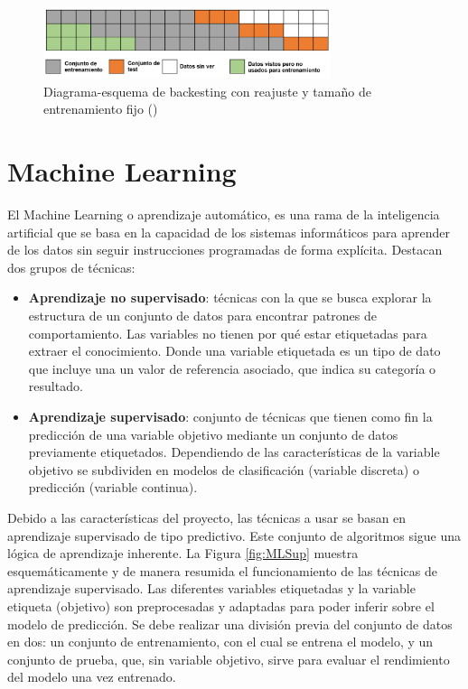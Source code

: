 \documentclass[12pt,a4paper]{report}
\begin{document}
\begin{itemize}
    \begin{figure}[H]
    \centering
    \includegraphics[width=0.75\textwidth]{Images/tfm-2.13.png}
    \caption{Diagrama-esquema de backesting con reajuste y tamaño de entrenamiento fijo (\cite{skforecast})}
    \label{fig:bck3}
    \end{figure}
    
\end{itemize}


\section{Machine Learning}

El Machine Learning o aprendizaje automático, es una rama de la inteligencia artificial que se basa en la capacidad de los sistemas informáticos para aprender de los datos sin seguir instrucciones programadas de forma explícita. Destacan dos grupos de técnicas:

\begin{itemize}
    \item \textbf{Aprendizaje no supervisado}: técnicas con la que se busca explorar la estructura de un conjunto de datos para encontrar patrones de comportamiento. Las variables no tienen por qué estar etiquetadas para extraer el conocimiento. Donde una variable etiquetada es un tipo de dato que incluye una un valor de referencia asociado, que indica su categoría o resultado.

    \item \textbf{Aprendizaje supervisado}: conjunto de técnicas que tienen como fin la predicción de una variable objetivo mediante un conjunto de datos previamente etiquetados. Dependiendo de las características de la variable objetivo se subdividen en modelos de clasificación (variable discreta) o predicción (variable continua).
\end{itemize}

Debido a las características del proyecto, las técnicas a usar se basan en aprendizaje supervisado de tipo predictivo. Este conjunto de algoritmos sigue una lógica de aprendizaje inherente. La Figura \ref{fig:MLSup} muestra esquemáticamente y de manera resumida el funcionamiento de las técnicas de aprendizaje supervisado. Las diferentes variables etiquetadas y la variable etiqueta (objetivo) son preprocesadas y adaptadas para poder inferir sobre el modelo de predicción. Se debe realizar una división previa del conjunto de datos en dos: un conjunto de entrenamiento, con el cual se entrena el modelo, y un conjunto de prueba, que, sin variable objetivo, sirve para evaluar el rendimiento del modelo una vez entrenado.
\end{document}
